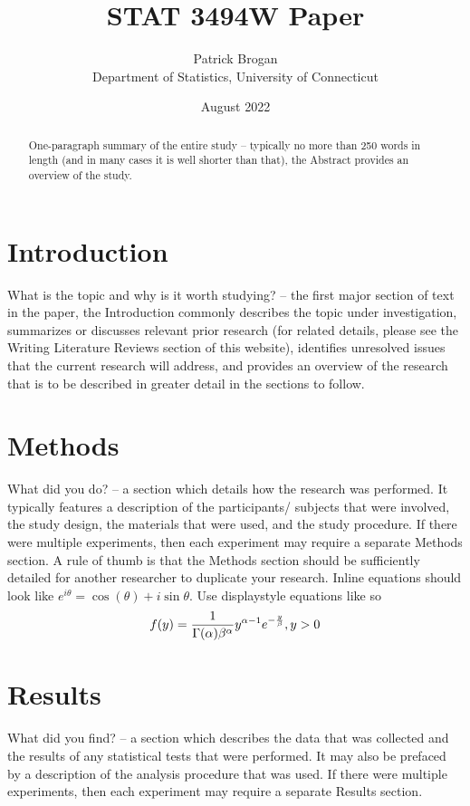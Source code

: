 \documentclass[12pt, letterpaper, twoside]{article}\usepackage[]{graphicx}\usepackage[]{xcolor}
\title{STAT 3494W Paper}
\author{Patrick Brogan\\[1ex]
  Department of Statistics, University of Connecticut\\}
\date{August 2022}
\begin{document}
\maketitle

\begin{abstract}
One-paragraph summary of the entire study – typically no more than
250 words in length (and in many cases it is well shorter than that),
the Abstract provides an overview of the study.
\end{abstract}

\section*{Introduction}
What is the topic and why is it worth studying? – the first major
section of text in the paper, the Introduction commonly describes
the topic under investigation, summarizes or discusses relevant
prior research (for related details, please see the Writing Literature
Reviews section of this website), identifies unresolved issues that
the current research will address, and provides an overview of the
research that is to be described in greater detail in the sections to
follow.

\section*{Methods}
What did you do? – a section which details how the research was
performed.  It typically features a description of the participants/
subjects that were involved, the study design, the materials that were
used, and the study procedure.  If there were multiple experiments,
then each experiment may require a separate Methods section.  A rule
of thumb is that the Methods section should be sufficiently detailed
for another researcher to duplicate your research. Inline equations should look like \(e^{i\theta} = \cos(\theta) + i\sin\theta\). Use displaystyle equations like so \begin{equation}
  \label{eq:ks_standard}
  f(y) = \frac{1}{\Gamma(\alpha)\beta^\alpha}\*y^{\alpha-1}e^{-\frac{y}{\beta}}, y > 0
\end{equation}

\section*{Results}
What did you find? – a section which describes the data that was
collected and the results of any statistical tests that were performed.
It may also be prefaced by a description of the analysis procedure that
was used. If there were multiple experiments, then each experiment may
require a separate Results section.
\end{document}
